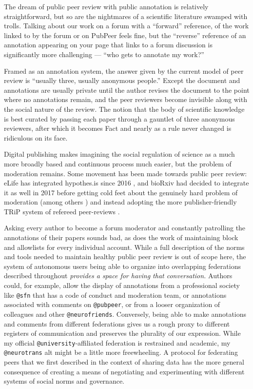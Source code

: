 \documentclass[10pt]{article}
\begin{document}
\begin{multicols}{2}
The dream of public peer review with public annotation is relatively
straightforward, but so are the nightmares of a scientific literature
swamped with trolls. Talking about our work on a forum with a
``forward'' reference, of the work linked to by the forum or on PubPeer
feels fine, but the ``reverse'' reference of an annotation appearing on
your page that links to a forum discussion is significantly more
challenging --- ``who gets to annotate my work?''

Framed as an annotation system, the answer given by the current model of
peer review is ``usually three, usually anonymous people.'' Except the
document and annotations are usually private until the author revises
the document to the point where no annotations remain, and the peer
reviewers become invisible along with the social nature of the review.
The notion that the body of scientific knowledge is best curated by
passing each paper through a gauntlet of three anonymous reviewers,
after which it becomes Fact and nearly as a rule never changed is
ridiculous on its face.

Digital publishing makes imagining the social regulation of science as a
much more broadly based and continuous process much easier, but the
problem of moderation remains. Some movement has been made towards
public peer review: eLife has integrated hypothes.is since 2016 \cite{ELifePartnersHypothes2016} , and bioRxiv had decided to
integrate it as well in 2017 \cite{dwhlyBioRxivSelectsHypothesis2017}  before getting cold feet about the genuinely hard problem of
moderation (among others \cite{heatherstainesPreprintServicesGather2018} ) and instead adopting the
more publisher-friendly TRiP system of refereed peer-reviews \cite{nateangellAnnouncingTRiPTransparent2019} .

Asking every author to become a forum moderator and constantly
patrolling the annotations of their papers sounds bad, as does the work
of maintaining block and allowlists for every individual account. While
a full description of the norms and tools needed to maintain healthy
public peer review is out of scope here, the system of autonomous users
being able to organize into overlapping federations described throughout
\emph{provides a space for having that conversation.} Authors could, for
example, allow the display of annotations from a professional society
like \texttt{@sfn} that has a code of conduct and moderation team, or
annotations associated with comments on \texttt{@pubpeer}, or from a
looser organization of colleagues and other \texttt{@neurofriends}.
Conversely, being able to make annotations and comments from different
federations gives us a rough proxy to different registers of
communication and preserves the plurality of our expression. While my
official \texttt{@university}-affiliated federation is restrained and
academic, my \texttt{@neurotrans} alt might be a little more
freewheeling. A protocol for federating peers that we first described in
the context of sharing data has the more general consequence of creating
a means of negotiating and experimenting with different systems of
social norms and governance.


\end{multicols}
\end{document}
